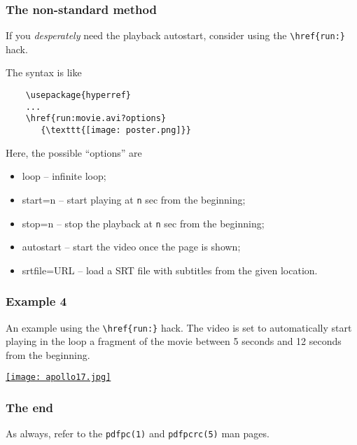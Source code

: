 \documentclass{beamer}
\newcommand{\opt}[1]{\texttt{#1}\xspace}
\begin{document}
\begin{frame}[fragile]
  \frametitle{The non-standard method}

  If you {\em desperately} need the playback autostart, consider
  using the \opt{\textbackslash href\{run:\}} hack.

  The syntax is like

  \begin{lstlisting}
    \usepackage{hyperref}
    ...
    \href{run:movie.avi?options}
       {\texttt{[image: poster.png]}}
  \end{lstlisting}

  Here, the possible ``options'' are
  \begin{itemize}
    \item loop -- infinite loop;
    \item start=n -- start playing at \opt{n} sec from the beginning;
    \item stop=n -- stop the playback at \opt{n} sec from the beginning;
    \item autostart -- start the video once the page is shown;
    \item srtfile=URL -- load a SRT file with subtitles from the given
      location.
  \end{itemize}

\end{frame}

\begin{frame}
  \frametitle{Example 4}

  An example using the \opt{\textbackslash href\{run:\}} hack. The
  video is set to automatically start playing in the loop a fragment of the
  movie between 5 seconds and 12 seconds from the beginning.

  \vspace{5pt}

  \begin{center}
    \href{run:apollo17.avi?autostart&loop&start=5&stop=12}
       {\texttt{[image: apollo17.jpg]}}
  \end{center}
\end{frame}

\begin{frame}
  \frametitle{The end}
  
  As always, refer to the \opt{pdfpc(1)} and \opt{pdfpcrc(5)} man pages.

\end{frame}
\end{document}
